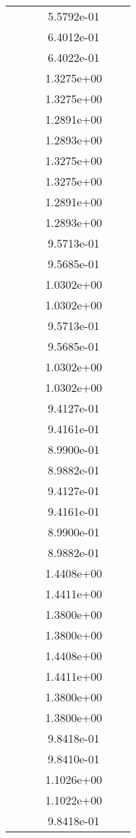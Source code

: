 \begin{xltabular}{\textwidth}{r|rS[table-format=1.3e+2]S[table-format=1.4e+2]S[table-format=1.4e+2]S[table-format=-1.5]}
&  &  & 5.5792e-01 & & \\
&  &  & 6.4012e-01 & & \\
&  &  & 6.4022e-01 & & \\
&  &  & 1.3275e+00 & & \\
&  &  & 1.3275e+00 & & \\
&  &  & 1.2891e+00 & & \\
&  &  & 1.2893e+00 & & \\
&  &  & 1.3275e+00 & & \\
&  &  & 1.3275e+00 & & \\
&  &  & 1.2891e+00 & & \\
&  &  & 1.2893e+00 & & \\
&  &  & 9.5713e-01 & & \\
&  &  & 9.5685e-01 & & \\
&  &  & 1.0302e+00 & & \\
&  &  & 1.0302e+00 & & \\
&  &  & 9.5713e-01 & & \\
&  &  & 9.5685e-01 & & \\
&  &  & 1.0302e+00 & & \\
&  &  & 1.0302e+00 & & \\
&  &  & 9.4127e-01 & & \\
&  &  & 9.4161e-01 & & \\
&  &  & 8.9900e-01 & & \\
&  &  & 8.9882e-01 & & \\
&  &  & 9.4127e-01 & & \\
&  &  & 9.4161e-01 & & \\
&  &  & 8.9900e-01 & & \\
&  &  & 8.9882e-01 & & \\
&  &  & 1.4408e+00 & & \\
&  &  & 1.4411e+00 & & \\
&  &  & 1.3800e+00 & & \\
&  &  & 1.3800e+00 & & \\
&  &  & 1.4408e+00 & & \\
&  &  & 1.4411e+00 & & \\
&  &  & 1.3800e+00 & & \\
&  &  & 1.3800e+00 & & \\
&  &  & 9.8418e-01 & & \\
&  &  & 9.8410e-01 & & \\
&  &  & 1.1026e+00 & & \\
&  &  & 1.1022e+00 & & \\
&  &  & 9.8418e-01 & & \\

\end{xltabular}
